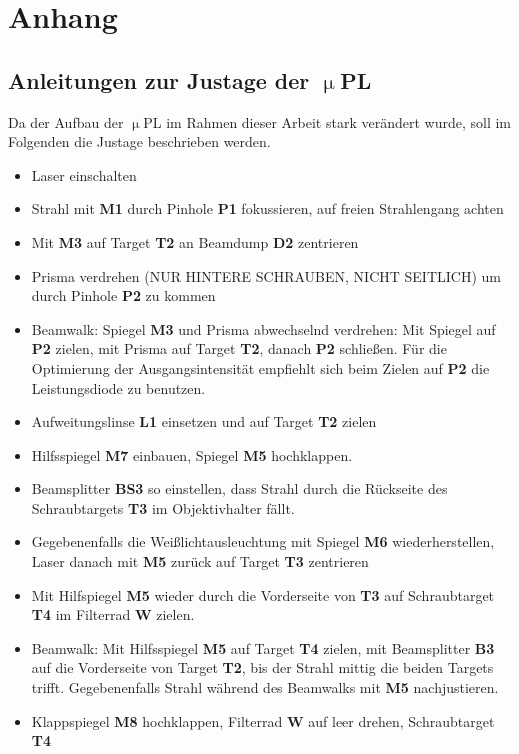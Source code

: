 \chapter{Anhang} \section{Anleitungen zur Justage der \( \upmu \)PL}\label{Justage}
Da der Aufbau der \( \upmu \)PL im Rahmen dieser Arbeit stark verändert wurde,
soll im Folgenden die Justage beschrieben werden. \begin{itemize} \item Laser
einschalten \item Strahl mit \textbf{M1} durch Pinhole \textbf{P1} fokussieren,
auf freien Strahlengang achten \item Mit \textbf{M3} auf Target \textbf{T2} an
Beamdump \textbf{D2} zentrieren \item Prisma verdrehen (NUR HINTERE SCHRAUBEN,
NICHT SEITLICH) um durch Pinhole \textbf{P2} zu kommen \item Beamwalk: Spiegel
\textbf{M3} und Prisma abwechselnd verdrehen: Mit Spiegel auf \textbf{P2}
zielen, mit Prisma auf Target \textbf{T2}, danach \textbf{P2} schließen. Für die
Optimierung der Ausgangsintensität empfiehlt sich  beim Zielen auf \textbf{P2}
die Leistungsdiode zu benutzen. \item Aufweitungslinse \textbf{L1} einsetzen und
auf Target \textbf{T2} zielen \item Hilfsspiegel \textbf{M7} einbauen, Spiegel
\textbf{M5} hochklappen. \item Beamsplitter \textbf{BS3} so einstellen, dass
Strahl durch die Rückseite des Schraubtargets \textbf{T3} im Objektivhalter
fällt. \item Gegebenenfalls die Weißlichtausleuchtung mit Spiegel \textbf{M6}
wiederherstellen, Laser danach mit \textbf{M5} zurück auf Target \textbf{T3}
zentrieren  \item Mit Hilfspiegel \textbf{M5} wieder durch die Vorderseite von
\textbf{T3} auf Schraubtarget \textbf{T4} im Filterrad \textbf{W} zielen. \item
Beamwalk: Mit Hilfsspiegel \textbf{M5} auf Target \textbf{T4} zielen, mit
Beamsplitter \textbf{B3} auf die Vorderseite von Target \textbf{T2}, bis der
Strahl mittig die beiden Targets trifft. Gegebenenfalls Strahl während des
Beamwalks mit \textbf{M5} nachjustieren. \item Klappspiegel \textbf{M8}
hochklappen, Filterrad \textbf{W} auf leer drehen, Schraubtarget \textbf{T4}

\end{itemize}
